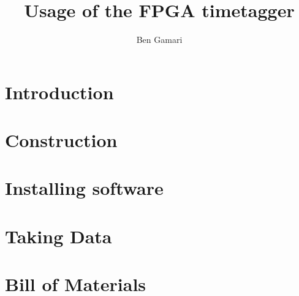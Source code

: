 \documentclass{report}
\begin{document}
\title{Usage of the FPGA timetagger}
\author{Ben Gamari}
\maketitle

\chapter{Introduction}


\chapter{Construction}
\label{Ch:Construction}


\chapter{Installing software}
\label{Ch:Installing}


\chapter{Taking Data}
\label{Ch:TakingData}


\appendix
\chapter{Bill of Materials}
\label{Ch:BoM}

\end{document}
